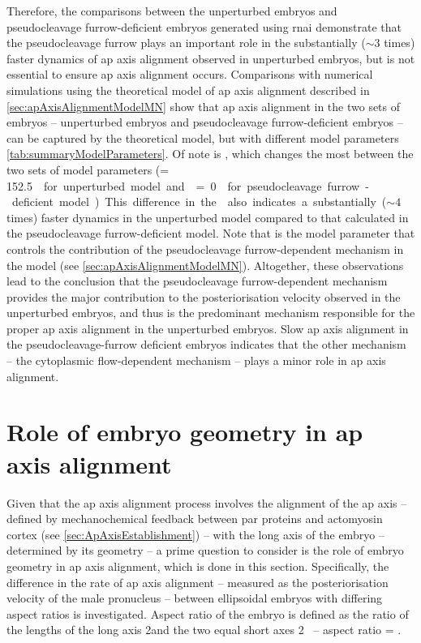 Therefore, the comparisons between the unperturbed embryos and pseudocleavage furrow-deficient embryos generated using  \ac{rnai} demonstrate that the pseudocleavage furrow plays an important role in the substantially ($\sim 3$ times) faster dynamics of \ac{ap} axis alignment observed in unperturbed embryos, but is not essential to ensure \ac{ap} axis alignment occurs. Comparisons with numerical simulations using the theoretical model of \ac{ap} axis alignment described in \autoref{sec:apAxisAlignmentModelMN} show that \ac{ap} axis alignment in the two sets of embryos -- unperturbed embryos and pseudocleavage furrow-deficient embryos -- can be captured by the theoretical model, but with different model parameters \autoref{tab:summaryModelParameters}. Of note is \nematicLength, which changes the most between the two sets of model parameters (\nematicLength = \SI{152.5}{\square\unitLength\per\second} for unperturbed model and \nematicLength = \SI{0}{\square\unitLength\per\second} for pseudocleavage furrow-deficient model). This difference in the \nematicLength also indicates a substantially ($\sim 4$ times) faster dynamics in the unperturbed model compared to that calculated in the pseudocleavage furrow-deficient model. Note that \nematicLength is the model parameter that controls the contribution of the pseudocleavage furrow-dependent mechanism in the model (see \autoref{sec:apAxisAlignmentModelMN}). Altogether, these observations lead to the conclusion that the pseudocleavage furrow-dependent mechanism provides the major contribution to the posteriorisation velocity observed in the unperturbed embryos, and thus is the predominant mechanism responsible for the proper \ac{ap} axis alignment in the unperturbed embryos. Slow \ac{ap} axis alignment in the pseudocleavage-furrow deficient embryos indicates that the other mechanism -- the cytoplasmic flow-dependent mechanism -- plays a minor role in \ac{ap} axis alignment.

\FloatBarrier
\section{Role of embryo geometry in \acs{ap} axis alignment}\label{sec:GeometryRole}
Given that the \ac{ap} axis alignment process involves the alignment of the \ac{ap} axis -- defined by mechanochemical feedback between \ac{par} proteins and actomyosin cortex (see \autoref{sec:ApAxisEstablishment}) -- with the long axis of the embryo -- determined by its geometry -- a prime question to consider is the role of embryo geometry in \ac{ap} axis alignment, which is done in this section. Specifically, the difference in the rate of \ac{ap} axis alignment -- measured as the posteriorisation velocity of the male pronucleus -- between ellipsoidal embryos with differing aspect ratios is investigated. Aspect ratio of the embryo is defined as the ratio of the lengths of the long axis 2\longAxisLength and the two equal short axes 2\shortAxisLength~ -- aspect ratio = \aspectRatio.

